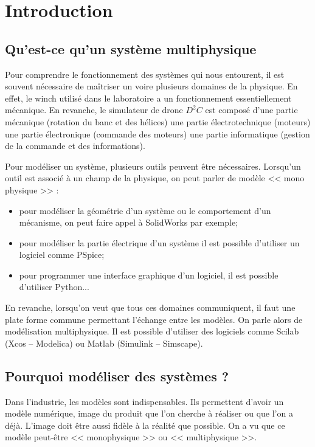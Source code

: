 \documentclass[10pt,fleqn]{article} %
\begin{document}

\setlength{\columnseprule}{.1pt}

\vspace{2cm}
\pagestyle{fancy}
\thispagestyle{plain}
\section{Introduction}
\subsection{Qu'est-ce qu'un système multiphysique}

Pour comprendre le fonctionnement des systèmes qui nous entourent, il est souvent nécessaire de maîtriser un voire plusieurs domaines de la physique. En effet, le winch utilisé dans le laboratoire a un fonctionnement essentiellement mécanique. En revanche, le simulateur de drone $D^2C$ est composé d'une partie mécanique (rotation du banc et des hélices) une partie électrotechnique (moteurs) une partie électronique (commande des moteurs) une partie informatique (gestion de la commande et des informations). 

Pour modéliser un système, plusieurs outils peuvent être nécessaires. Lorsqu'un outil est associé à un champ de la physique, on peut parler de modèle << mono physique >> :
\begin{itemize}
\item pour modéliser la géométrie d'un système ou le comportement d'un mécanisme, on peut faire appel à SolidWorks par exemple;
\item pour modéliser la partie électrique d'un système il est possible d'utiliser un logiciel comme PSpice;
\item pour programmer une interface graphique d'un logiciel, il est possible d'utiliser Python...
\end{itemize}

En revanche, lorsqu'on veut que tous ces domaines communiquent, il faut une plate forme commune permettant l'échange entre les modèles. On parle alors de modélisation multiphysique. Il est possible d'utiliser des logiciels comme Scilab (Xcos -- Modelica) ou Matlab (Simulink -- Simscape). 



\subsection{Pourquoi modéliser des systèmes ?}
Dans l'industrie, les modèles sont indispensables. Ils permettent d'avoir un modèle numérique, image du produit que l'on cherche à réaliser ou que l'on a déjà. L'image doit être aussi fidèle à la réalité que possible. On a vu que ce modèle peut-être << monophysique >> ou << multiphysique >>. 
\end{document}
